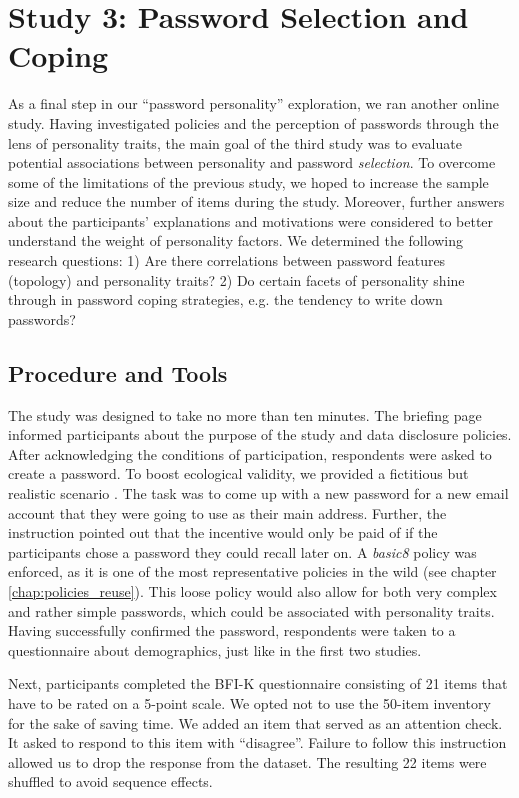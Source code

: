 \section{Study 3: Password Selection and Coping}\label{sec:personality:study3}
As a final step in our ``password personality'' exploration, we ran another online study. Having investigated policies and the perception of passwords through the lens of personality traits, the main goal of the third study was to evaluate potential associations between personality and password \textit{selection}. To overcome some of the limitations of the previous study, we hoped to increase the sample size and reduce the number of items during the study. Moreover, further answers about the participants' explanations and motivations were considered to better understand the weight of personality factors. We determined the following research questions: 1) Are there correlations between password features (topology) and personality traits? 2) Do certain facets of personality shine through in password coping strategies, e.g. the tendency to write down passwords?

\subsection{Procedure and Tools}
The study was designed to take no more than ten minutes. The briefing page informed participants about the purpose of the study and data disclosure policies. After acknowledging the conditions of participation, respondents were asked to create a password. To boost ecological validity, we provided a fictitious but realistic scenario \cite{Komanduri2011OfPasswordsAndPeople}. The task was to come up with a new password for a new email account that they were going to use as their main address. Further, the instruction pointed out that the incentive would only be paid of if the participants chose a password they could recall later on. A \textit{basic8} policy was enforced, as it is one of the most representative policies in the wild (see chapter \ref{chap:policies_reuse}). This loose policy would also allow for both very complex and rather simple passwords, which could be associated with personality traits. Having successfully confirmed the password, respondents were taken to a questionnaire about demographics, just like in the first two studies. 

Next, participants completed the BFI-K questionnaire consisting of 21 items that have to be rated on a 5-point scale. We opted not to use the 50-item inventory for the sake of saving time. We added an item that served as an attention check. It asked to respond to this item with ``disagree''. Failure to follow this instruction allowed us to drop the response from the dataset. The resulting 22 items were shuffled to avoid sequence effects. 

